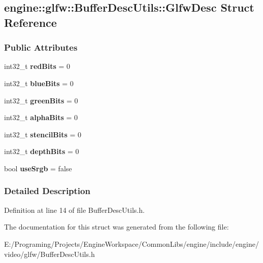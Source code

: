 \hypertarget{a00042}{}\subsection{engine\+:\+:glfw\+:\+:Buffer\+Desc\+Utils\+:\+:Glfw\+Desc Struct Reference}
\label{a00042}
\subsubsection*{Public Attributes}
\begin{DoxyCompactItemize}
\item 
int32\+\_\+t {\bfseries red\+Bits} = 0\hypertarget{a00042_a2c5c19f8fdecd7ff6b53ffdcc7ca2a93}{}\label{a00042_a2c5c19f8fdecd7ff6b53ffdcc7ca2a93}

\item 
int32\+\_\+t {\bfseries blue\+Bits} = 0\hypertarget{a00042_ad162b71247141e47b5e42a7def102b26}{}\label{a00042_ad162b71247141e47b5e42a7def102b26}

\item 
int32\+\_\+t {\bfseries green\+Bits} = 0\hypertarget{a00042_a161ee120c160dd36d7a42389101ec6d6}{}\label{a00042_a161ee120c160dd36d7a42389101ec6d6}

\item 
int32\+\_\+t {\bfseries alpha\+Bits} = 0\hypertarget{a00042_a488c03ac5a2cb6e968516e4062ff6c1f}{}\label{a00042_a488c03ac5a2cb6e968516e4062ff6c1f}

\item 
int32\+\_\+t {\bfseries stencil\+Bits} = 0\hypertarget{a00042_a6b3341927ea496b51aeb04c9c99569b2}{}\label{a00042_a6b3341927ea496b51aeb04c9c99569b2}

\item 
int32\+\_\+t {\bfseries depth\+Bits} = 0\hypertarget{a00042_ac27b9115a46506f023f163ec0ac25802}{}\label{a00042_ac27b9115a46506f023f163ec0ac25802}

\item 
bool {\bfseries use\+Srgb} = false\hypertarget{a00042_a7faef9279f4dd062aa5bd55daeae2dbe}{}\label{a00042_a7faef9279f4dd062aa5bd55daeae2dbe}

\end{DoxyCompactItemize}


\subsubsection{Detailed Description}


Definition at line 14 of file Buffer\+Desc\+Utils.\+h.



The documentation for this struct was generated from the following file\+:\begin{DoxyCompactItemize}
\item 
E\+:/\+Programing/\+Projects/\+Engine\+Workspace/\+Common\+Libs/engine/include/engine/video/glfw/Buffer\+Desc\+Utils.\+h\end{DoxyCompactItemize}
